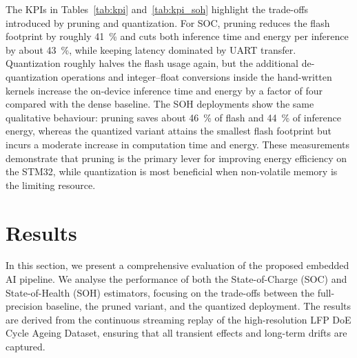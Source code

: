 \documentclass[review]{elsarticle}
\begin{document}
The KPIs in Tables~\ref{tab:kpi} and~\ref{tab:kpi_soh} highlight the trade-offs introduced by pruning and quantization.
For SOC, pruning reduces the flash footprint by roughly 41~\% and cuts both inference time and energy per inference
by about 43~\%, while keeping latency dominated by UART transfer. Quantization roughly halves the flash usage again,
but the additional de-quantization operations and integer--float conversions inside the hand-written kernels increase
the on-device inference time and energy by a factor of four compared with the dense baseline. The SOH deployments show
the same qualitative behaviour: pruning saves about 46~\% of flash and 44~\% of inference energy, whereas the
quantized variant attains the smallest flash footprint but incurs a moderate increase in computation time and energy.
These measurements demonstrate that pruning is the primary lever for improving energy efficiency on the STM32, while
quantization is most beneficial when non-volatile memory is the limiting resource.

\section{Results}
\label{sec:results}
In this section, we present a comprehensive evaluation of the proposed embedded AI pipeline. We analyse the performance of both the State-of-Charge (SOC) and State-of-Health (SOH) estimators, focusing on the trade-offs between the full-precision baseline, the pruned variant, and the quantized deployment. The results are derived from the continuous streaming replay of the high-resolution LFP DoE Cycle Ageing Dataset, ensuring that all transient effects and long-term drifts are captured.
\end{document}
